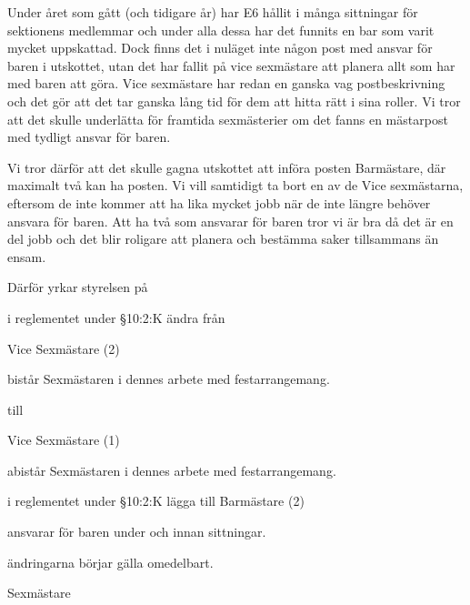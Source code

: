 \documentclass[../_main/handlingar.tex]{subfiles}
\begin{document}
Under året som gått (och tidigare år) har E6 hållit i många sittningar för sektionens medlemmar och under alla dessa har det funnits en bar som varit mycket uppskattad. Dock finns det i nuläget inte någon post med ansvar för baren i utskottet, utan det har fallit på vice sexmästare att planera allt som har med baren att göra. Vice sexmästare har redan en ganska vag postbeskrivning och det gör att det tar ganska lång tid för dem att hitta rätt i sina roller. Vi tror att det skulle underlätta för framtida sexmästerier om det fanns en mästarpost med tydligt ansvar för baren.

Vi tror därför att det skulle gagna utskottet att införa posten Barmästare, där maximalt två kan ha posten. Vi vill samtidigt ta bort en av de Vice sexmästarna, eftersom de inte kommer att ha lika mycket jobb när de inte längre behöver ansvara för baren. Att ha två som ansvarar för baren tror vi är bra då det är en del jobb och det blir roligare att planera och bestämma saker tillsammans än ensam.

Därför yrkar styrelsen på
\begin{attsatser}
    \att i reglementet under §10:2:K ändra från

      Vice Sexmästare (2)
        \begin{tightdashlist}
            \item bistår Sexmästaren i dennes arbete med festarrangemang.

        \end{tightdashlist}
        till

          Vice Sexmästare (1)
          \begin{tightdashlist}
              \item abistår Sexmästaren i dennes arbete med festarrangemang.
          \end{tightdashlist}

      \att i reglementet under §10:2:K lägga till
      Barmästare (2)
      \begin{tightdashlist}
          \item ansvarar för baren under och innan sittningar.
      \end{tightdashlist}
      \att ändringarna börjar gälla omedelbart.
\end{attsatser}

\begin{signatures}{1}
    \ist
    \signature{Linnea Sjödahl}{Sexmästare}
\end{signatures}
\end{document}
